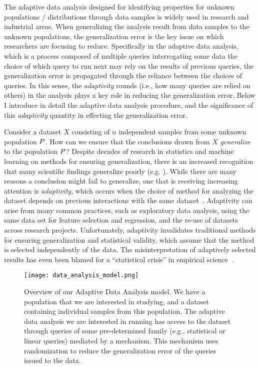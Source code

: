 The adaptive data analysis designed for identifying  properties for unknown populations / distributions 
through data samples is widely 
used in research and industrial areas.
When generalizing the analysis result from data samples to the unknown populations, 
the generalization error is the key issue on which researchers are focusing to reduce.
Specifically in the adaptive data analysis,
which is a process composed of 
multiple queries interrogating some data
the choice of which query to run next may rely on the results of previous queries,
the generalization error is propagated through the reliance between the choices of queries.
In this sense, the \emph{adaptivity} rounds (i.e., how many queries are relied on others) in the analysis plays a key role in reducing the generalization error.
Below I introduce in detail the adaptive data analysis procedure,
and the significance of this \emph{adaptivity} quantity in effecting the generalization error.

Consider a dataset $X$ consisting of $n$ independent samples from some unknown population $P$.  How can we ensure that the conclusions drawn from $X$ \emph{generalize} to the population $P$?  Despite decades of research in statistics and machine learning on methods for ensuring generalization, there is an increased recognition that many scientific findings generalize poorly (e.g. 
\cite{Ioannidis05,GelmanL13}
).  While there are many reasons a conclusion might fail to generalize, one that is receiving increasing attention is \emph{adaptivity}, which occurs when the choice of method for analyzing the dataset depends on previous interactions with the same dataset~\cite{GelmanL13}.
%
 Adaptivity can arise from many common practices, such as exploratory data analysis, using the same data set for feature selection and regression, and the re-use of datasets across research projects.  Unfortunately, adaptivity invalidates traditional methods for ensuring generalization and statistical validity, which assume that the method is selected independently of the data. The misinterpretation of adaptively selected results has even been blamed for a ``statistical crisis'' in empirical science~\cite{GelmanL13}.

\begin{figure}
    \centering
    \texttt{[image: data\_analysis\_model.png]}
    \caption{Overview of our Adaptive Data Analysis model.
    We have a population that we are interested in studying, and a dataset containing individual samples from this population. 
    The adaptive data analysis we are interested in running has access to the dataset through queries of some pre-determined family (e.g., statistical or linear queries) mediated by a mechanism. 
    This mechanism uses randomization to reduce the generalization error of the queries issued to the data.}
    \label{fig:adaptivity-model-overview}
\vspace{-0.5cm}
\end{figure}

